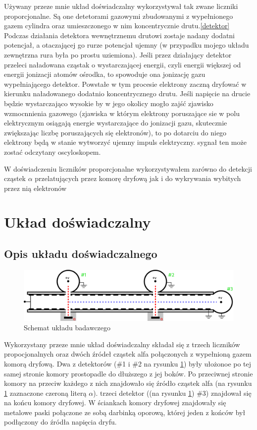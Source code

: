 \documentclass[10pt,a4paper]{article}
\begin{document}
Używany przeze mnie układ doświadczalny wykorzystywał tak zwane liczniki proporcjonalne. Są one detetorami gazowymi zbudowanymi z wypełnionego gazem cylindra oraz umieszczonego w nim koncentrycznie drutu.\ref{detektor} Podczas działania detektora wewnętrznemu drutowi zostaje nadany dodatni potencjał, a otaczającej go rurze potencjał ujemny (w przypadku mojego układu zewnętrzna rura była po prostu uziemiona). Jeśli przez działający detektor przeleci naładowana cząstak o wystarczającej energii, czyli energii większej od energii jonizacji atomów ośrodka, to spowoduje ona jonizację gazu wypełniającego detektor. Powstałe w tym procesie elektrony zaczną dryfować w kierunku naładowanego dodatnio koncentrycznego drutu. Jeśli napięcie na drucie będzie wystarczająco wysokie by w jego okolicy mogło zajść zjawisko wzmocnnienia gazowego (zjawiska w którym elektrony poruszające sie w polu elektrycznym osiągają energie wystarczające do jonizacji gazu, skutecznie zwiększając liczbę poruszających się elektronów), to po dotarciu do niego elektrony będą w stanie wytworzyć ujemny impuls elektryczny. sygnał ten może zostać odczytany oscyloskopem.\cite{detektory}

W doświadczeniu liczników proporcjonalne wykorzystywałem zarówno do detekcji cząstek $\alpha$ przelatujących przez komorę dryfową jak i do wykrywania wybitych przez nią elektronów

\section{Układ doświadczalny}

\subsection{Opis układu doświadczalnego}

\begin{figure}[h]
    \centering
    \includegraphics[width=12cm]{diagrams/uklad.pdf}
    \caption{Schemat układu badawczego }
    \label{schem}
\end{figure}

Wykorzystany przeze mnie układ doświadczalny składał się z trzech liczników propocjonalnych oraz dwóch źródeł cząstek alfa połączonych z wypełnioną gazem komorą dryfową\cite{instrukcja}. Dwa z detektorów (\#1 i \#2  na rysunku \ref{schem}) były ułożonoe po tej samej stronie komory prostopadle do dłuższego z jej boków. Po przeciwnej stronie komory na przeciw każdego z nich znajdowało się źródło cząstek alfa (na rysunku \ref{schem} zaznaczone czeroną literą $\alpha$). trzeci detektor ((na rysunku \ref{schem}) \#3) znajdował się na końcu komory dryfowej. W ściankach komory dryfowej znajdowały się metalowe paski połączone ze sobą darbinką oporową, której jeden z końców był podłączony do źródła napięcia dryfu.
\end{document}
